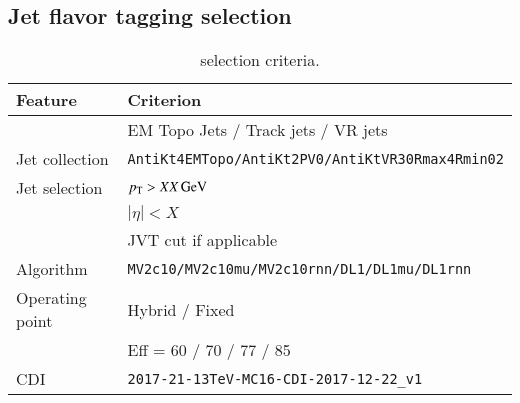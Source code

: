 \subsection{Jet flavor tagging selection}

\begin{table}[ht]
  \caption{\btag selection criteria.}%
  \label{tab:object:btag}
  \centering
  \begin{tabular}{ll}
    \toprule
    Feature & Criterion \\ 
    \midrule
    & EM Topo Jets / Track jets / VR jets \\
    \midrule
    Jet collection  & \texttt{AntiKt4EMTopo/AntiKt2PV0/AntiKtVR30Rmax4Rmin02} \\
    Jet selection   & \(\pT > \qty[parse-numbers=false]{XX}{\GeV}\) \\
    	            	& \(|\eta| < X\) \\				
                    & JVT cut if applicable \\
    \midrule
    Algorithm 		  & \texttt{MV2c10/MV2c10mu/MV2c10rnn/DL1/DL1mu/DL1rnn} \\
    \midrule
    Operating point & Hybrid /  Fixed \\
                    & Eff = 60 / 70 / 77 / 85 \\
    CDI             & \texttt{2017-21-13TeV-MC16-CDI-2017-12-22\_v1} \\
  \bottomrule
  \end{tabular}
\end{table}%
